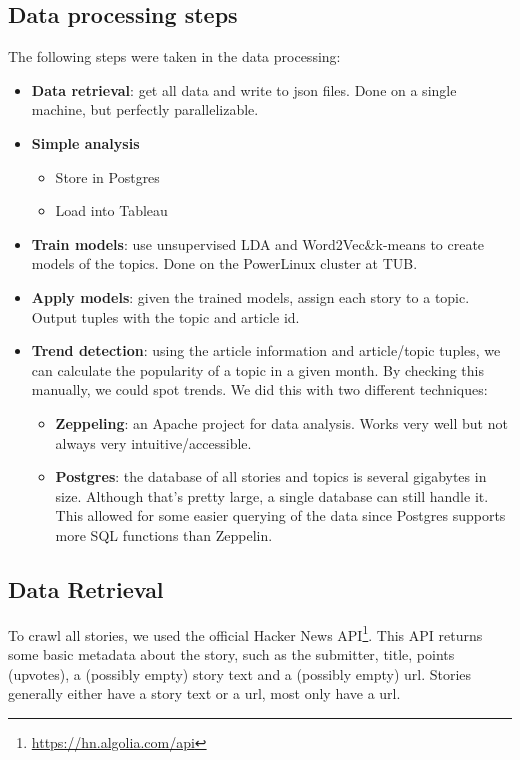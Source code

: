 \subsection{Data processing steps}
The following steps were taken in the data processing:
\begin{itemize}
\item \textbf{Data retrieval}: get all data and write to json files. Done on a single machine, but perfectly parallelizable.
\item \textbf{Simple analysis}
	\begin{itemize}
		\item Store in Postgres
		\item Load into Tableau
	\end{itemize}
\item \textbf{Train models}: use unsupervised LDA and Word2Vec\&k-means to create models of the topics. Done on the PowerLinux cluster at TUB.
\item \textbf{Apply models}: given the trained models, assign each story to a topic. Output tuples with the topic and article id.
\item \textbf{Trend detection}: using the article information and article/topic tuples, we can calculate the popularity of a topic in a given month. By checking this manually, we could spot trends. We did this with two different techniques:
	\begin{itemize}
		\item \textbf{Zeppeling}: an Apache project for data analysis. Works very well but not always very intuitive/accessible.
		\item \textbf{Postgres}: the database of all stories and topics is several gigabytes in size. Although that's pretty large, a single database can still handle it. This allowed for some easier querying of the data since Postgres supports more SQL functions than Zeppelin.
	\end{itemize}
\end{itemize}

\subsection{Data Retrieval}
To crawl all stories, we used the official Hacker News API\footnote{\url{https://hn.algolia.com/api}}. This API returns some basic metadata about the story, such as the submitter, title, points (upvotes), a (possibly empty) story text and a (possibly empty) url. Stories generally either have a story text or a url, most only have a url.

